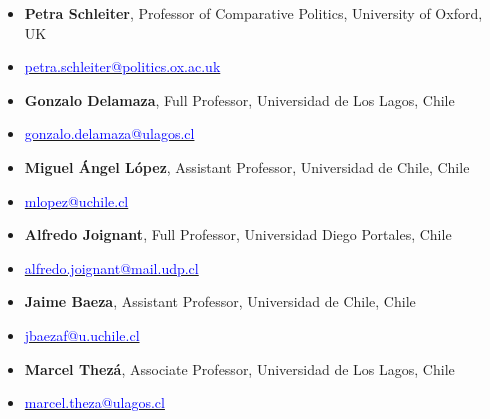 \begin{cvparagraph}

\begin{itemize}
\item[]{\small {\bfseries Petra Schleiter}, Professor of Comparative Politics, University of Oxford, UK}
\item[]{\vspace{-1mm}\textcolor{oxfordblue}{\faEnvelope} \hspace{0.1mm} {\small \href{mailto:petra.schleiter@politics.ox.ac.uk}{\textcolor{blue}{petra.schleiter@politics.ox.ac.uk}}}} \vspace{1.5mm}
\item[]{\small {\bfseries Gonzalo Delamaza}, Full Professor, Universidad de Los Lagos, Chile}
\item[]{\vspace{-1mm}\textcolor{oxfordblue}{\faEnvelope} \hspace{0.1mm} {\small \href{mailto:gonzalo.delamaza@ulagos.cl}{\textcolor{blue}{gonzalo.delamaza@ulagos.cl}}}} \vspace{1.5mm}
\item[]{\small {\bfseries Miguel \'Angel L\'opez}, Assistant Professor, Universidad de Chile, Chile}
\item[]{\vspace{-1mm}\textcolor{oxfordblue}{\faEnvelope} \hspace{0.1mm} {\small \href{mailto:mlopez@uchile.cl}{\textcolor{blue}{mlopez@uchile.cl}}}} \vspace{1.5mm}
\item[]{\small {\bfseries Alfredo Joignant}, Full Professor, Universidad Diego Portales, Chile}
\item[]{\vspace{-1mm}\textcolor{oxfordblue}{\faEnvelope} \hspace{0.1mm} {\small \href{mailto:alfredo.joignant@mail.udp.cl}{\textcolor{blue}{alfredo.joignant@mail.udp.cl}}}} \vspace{1.5mm}
\item[]{\small {\bfseries Jaime Baeza}, Assistant Professor, Universidad de Chile, Chile}
\item[]{\vspace{-1mm}\textcolor{oxfordblue}{\faEnvelope} \hspace{0.1mm} {\small \href{mailto:jbaezaf@u.uchile.cl}{\textcolor{blue}{jbaezaf@u.uchile.cl}}}} \vspace{1.5mm}
\item[]{\small {\bfseries Marcel Thez\'a}, Associate Professor, Universidad de Los Lagos, Chile}
\item[]{\vspace{-1mm}\textcolor{oxfordblue}{\faEnvelope} \hspace{0.1mm} {\small \href{mailto:marcel.theza@ulagos.cl}{\textcolor{blue}{marcel.theza@ulagos.cl}}}} \vspace{1.5mm}
\end{itemize}

\end{cvparagraph}
